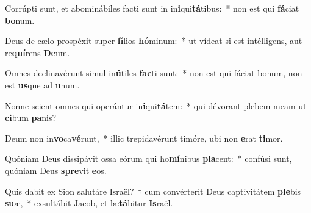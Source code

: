 \item Corrúpti sunt, et abominábiles facti sunt in in\textbf{i}qui\textbf{tá}tibus:~* non est qui \textbf{fá}ciat \textbf{bo}num.
\item Deus de cælo prospéxit super \textbf{fí}lios \textbf{hó}minum:~* ut vídeat si est intélligens, aut re\textbf{quí}rens \textbf{De}um.
\item Omnes declinavérunt simul in\textbf{ú}tiles \textbf{fac}ti sunt:~* non est qui fáciat bonum, non est \textbf{us}que ad \textbf{u}num.
\item Nonne scient omnes qui operántur in\textbf{i}qui\textbf{tá}tem:~* qui dévorant plebem meam ut \textbf{ci}bum \textbf{pa}nis?
\item Deum non in\textbf{vo}ca\textbf{vé}runt,~* illic trepidavérunt timóre, ubi non \textbf{e}rat \textbf{ti}mor.
\item Quóniam Deus dissipávit ossa eórum qui ho\textbf{mí}nibus \textbf{pla}cent:~* confúsi sunt, quóniam Deus \textbf{spre}vit \textbf{e}os.
\item Quis dabit ex Sion salutáre Israël?~† cum convérterit Deus captivitátem \textbf{ple}bis \textbf{su}æ,~* exsultábit Jacob, et læ\textbf{tá}bitur \textbf{Is}raël.
